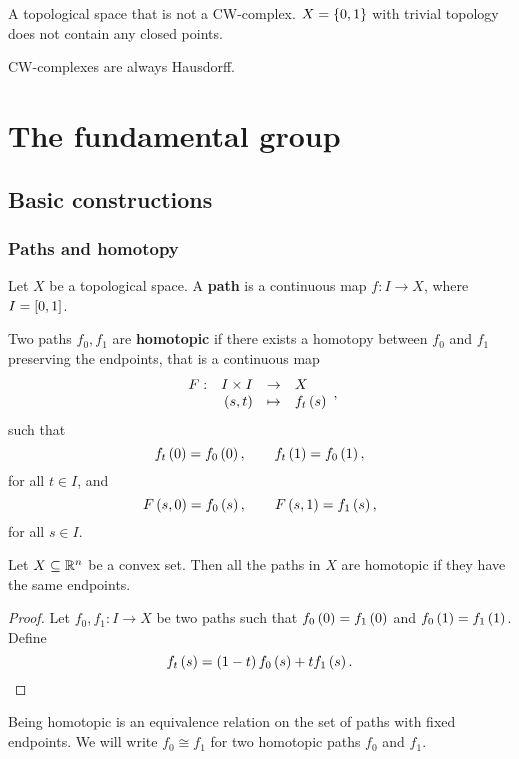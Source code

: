\begin{example*}
A topological space that is not a CW-complex. $ X = \cb{0, 1} $ with trivial topology does not contain any closed points.
\end{example*}

\begin{fact*}
CW-complexes are always Hausdorff.
\end{fact*}

\pagebreak

\section{The fundamental group}

\subsection{Basic constructions}

\subsubsection{Paths and homotopy}

Let $ X $ be a topological space. A \textbf{path} is a continuous map $ f : I \to X $, where $ I = \sb{0, 1} $.

\begin{definition*}
Two paths $ f_0, f_1 $ are \textbf{homotopic} if there exists a homotopy between $ f_0 $ and $ f_1 $ preserving the endpoints, that is a continuous map
$$ \function[F]{I \times I}{X}{\rb{s, t}}{f_t\rb{s}}, $$
such that
$$ f_t\rb{0} = f_0\rb{0}, \qquad f_t\rb{1} = f_0\rb{1}, $$
for all $ t \in I $, and
$$ F\rb{s, 0} = f_0\rb{s}, \qquad F\rb{s, 1} = f_1\rb{s}, $$
for all $ s \in I $.
\end{definition*}

\begin{example*}
Let $ X \subseteq \R^n $ be a convex set. Then all the paths in $ X $ are homotopic if they have the same endpoints.
\end{example*}

\begin{proof}
Let $ f_0, f_1 : I \to X $ be two paths such that $ f_0\rb{0} = f_1\rb{0} $ and $ f_0\rb{1} = f_1\rb{1} $. Define
$$ f_t\rb{s} = \rb{1 - t}f_0\rb{s} + tf_1\rb{s}. $$
\end{proof}

\begin{lemma}
Being homotopic is an equivalence relation on the set of paths with fixed endpoints. We will write $ f_0 \cong f_1 $ for two homotopic paths $ f_0 $ and $ f_1 $.
\end{lemma}

